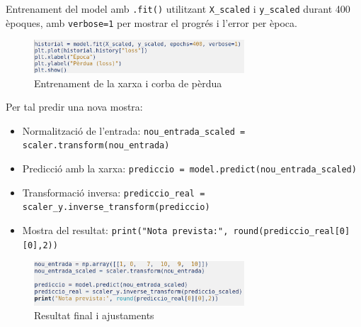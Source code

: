 Entrenament del model amb \texttt{.fit()} utilitzant \texttt{X\_scaled} i \texttt{y\_scaled} durant 400 èpoques, amb \texttt{verbose=1} per mostrar el progrés i l’error per època.

\begin{figure}[H]
\centering
\includegraphics[width=0.7\textwidth]{./figures/28.png}
\caption{Entrenament de la xarxa i corba de pèrdua}
\end{figure}

Per tal predir una nova mostra:
\begin{itemize}
\item Normalització de l’entrada: \texttt{nou\_entrada\_scaled = scaler.transform(nou\_entrada)}
\item Predicció amb la xarxa: \texttt{prediccio = model.predict(nou\_entrada\_scaled)}
\item Transformació inversa: \texttt{prediccio\_real = scaler\_y.inverse\_transform(prediccio)}
\item Mostra del resultat: \texttt{print("Nota prevista:", round(prediccio\_real[0][0],2))}
\end{itemize}

\begin{figure}[h!]
\centering
\includegraphics[width=0.7\textwidth]{./figures/29.png}
\caption{Resultat final i ajustaments}
\end{figure}


